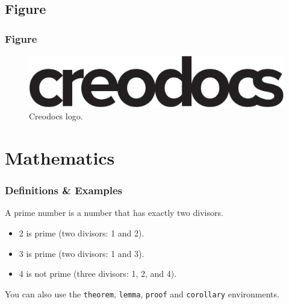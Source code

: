 \documentclass[
	11pt, %
]{beamer}
\begin{document}

\subsection{Figure}

\begin{frame}
	\frametitle{Figure}
	
	\begin{figure}
		\includegraphics[width=0.8\linewidth]{creodocs_logo.pdf}
		\caption{Creodocs logo.}
	\end{figure}
\end{frame}


\section{Mathematics}

\begin{frame}
	\frametitle{Definitions \& Examples}
	
	\begin{definition}
		A \alert{prime number} is a number that has exactly two divisors.
	\end{definition}
	
	\smallskip %
	
	\begin{example}
		\begin{itemize}
			\item 2 is prime (two divisors: 1 and 2).
			\item 3 is prime (two divisors: 1 and 3).
			\item 4 is not prime (\alert{three} divisors: 1, 2, and 4).
		\end{itemize}
	\end{example}
	
	\smallskip %
	
	You can also use the \texttt{theorem}, \texttt{lemma}, \texttt{proof} and \texttt{corollary} environments.
\end{frame}

\end{document}
